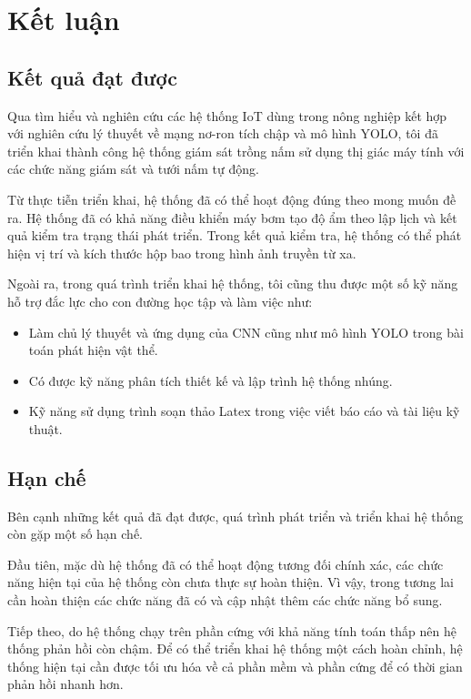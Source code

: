 \cleardoublepage
{}
\chapter*{Kết luận}

\section*{Kết quả đạt được}

Qua tìm hiểu và nghiên cứu các hệ thống IoT dùng trong nông nghiệp kết hợp với nghiên cứu lý thuyết về mạng nơ-ron tích chập và mô hình YOLO, tôi đã triển khai thành công hệ thống giám sát trồng nấm sử dụng thị giác máy tính với các chức năng giám sát và tưới nấm tự động.

Từ thực tiễn triển khai, hệ thống đã có thể hoạt động đúng theo mong muốn đề ra. Hệ thống đã có khả năng điều khiển máy bơm tạo độ ẩm theo lập lịch và kết quả kiểm tra trạng thái phát triển. Trong kết quả kiểm tra, hệ thống có thể phát hiện vị trí và kích thước hộp bao trong hình ảnh truyền từ xa.

Ngoài ra, trong quá trình triển khai hệ thống, tôi cũng thu được một số kỹ năng hỗ trợ đắc lực cho con đường học tập và làm việc như:

\begin{itemize}
	\item Làm chủ lý thuyết và ứng dụng của CNN cũng như mô hình YOLO trong bài toán phát hiện vật thể.	
	\item Có được kỹ năng phân tích thiết kế và lập trình hệ thống nhúng.
	\item Kỹ năng sử dụng trình soạn thảo Latex trong việc viết báo cáo và tài liệu kỹ thuật.
\end{itemize}

\section*{Hạn chế}

Bên cạnh những kết quả đã đạt được, quá trình phát triển và triển khai hệ thống còn gặp một số hạn chế.

Đầu tiên, mặc dù hệ thống đã có thể hoạt động tương đối chính xác, các chức năng hiện tại của hệ thống còn chưa thực sự hoàn thiện. Vì vậy, trong tương lai cần hoàn thiện các chức năng đã có và cập nhật thêm các chức năng bổ sung.

Tiếp theo, do hệ thống chạy trên phần cứng với khả năng tính toán thấp nên hệ thống phản hồi còn chậm. Để có thể triển khai hệ thống một cách hoàn chỉnh, hệ thống hiện tại cần được tối ưu hóa về cả phần mềm và phần cứng để có thời gian phản hồi nhanh hơn.

